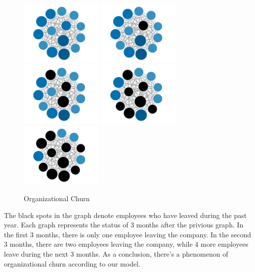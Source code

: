 \documentclass[12pt,a4paper,titlepage]{article}
\begin{document}
\begin{figure}[htb]
  \centering
  \includegraphics[width=4cm]{Pic3_0.png}
  \includegraphics[width=4cm]{Pic3_1.png}
  \includegraphics[width=4cm]{Pic3_2.png}
  \includegraphics[width=4cm]{Pic3_3.png}
  \includegraphics[width=4cm]{Pic3_4.png}
  \caption{Organizational Churn}\label{organizational-churn}
\end{figure}

The black spots in the graph denote employees who have leaved during
the past year. Each graph represents the status of 3 months after the
privious graph. In the first 3 months, there is only one employee leaving the company. In the second 3 months, there are two employees leaving the
company, while 4 more employees leave during the next 3 months. As a
conclusion, there's a phenomenon of organizational churn according to
our model.
\end{document}
